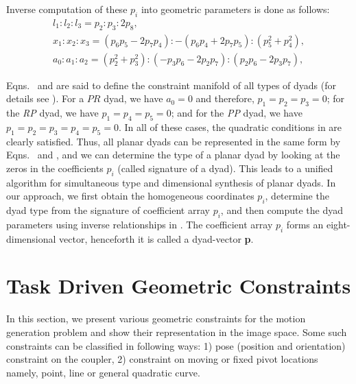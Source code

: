 Inverse computation of these $p_i$ into geometric parameters is done as follows:
\begin{equation}\label{inverse}
\begin{array}{c}
l_1:l_2:l_3=p_2:p_3:2p_8,\\
x_1:x_2:x_3=(p_6p_5-2p_7p_4):-(p_6p_4+2p_7p_5):(p_5^2+p_4^2),\\
a_0:a_1:a_2=(p_2^2+p_3^2):(-p_3p_6-2p_2p_7):(p_2p_6-2p_3p_7),
\end{array}
\end{equation}

Eqns.~ and  are said to define the constraint manifold of all types of dyads (for details see \cite{generalfitting-JCISE}).
For a $PR$ dyad, we have $a_0=0$ and therefore, $p_1=p_2=p_3=0$; for the \emph{RP} dyad, we have  $p_1=p_4=p_5=0$; and for the \emph{PP} dyad, we have $p_1=p_2=p_3=p_4=p_5=0$. In all of these cases, the quadratic conditions in  are clearly satisfied.
Thus, all planar dyads can be represented in the same form by Eqns.~ and , and we can determine the type of a planar dyad by looking at the zeros in the coefficients $p_i$ (called signature of a dyad). This leads to a unified algorithm
for simultaneous type and dimensional synthesis of planar dyads. In our approach, we first obtain the homogeneous coordinates $p_i$, determine the dyad type from the signature of coefficient array $p_i$, and then compute the dyad parameters using inverse relationships in . The coefficient array $p_i$ forms an eight-dimensional vector, henceforth it is called a dyad-vector \textbf{p}.

\section{Task Driven Geometric Constraints}\label{practConstraints}
In this section, we present various geometric constraints for the motion generation problem and show their representation in the image space. Some such constraints can be classified in following ways: 1) pose (position and orientation) constraint on the coupler, 2) constraint on moving or fixed pivot locations namely, point, line or general quadratic curve.

